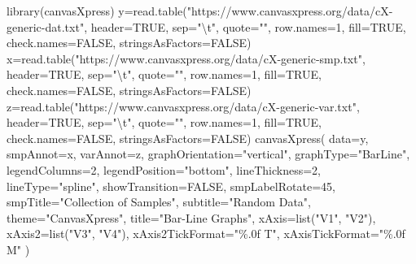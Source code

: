 \documentclass[
  letterpaper,
]{scrbook}
\newenvironment{Shaded}{\begin{snugshade}}{\end{snugshade}}
\newcommand{\AttributeTok}[1]{\textcolor[rgb]{0.40,0.45,0.13}{#1}}
\newcommand{\ConstantTok}[1]{\textcolor[rgb]{0.56,0.35,0.01}{#1}}
\newcommand{\DecValTok}[1]{\textcolor[rgb]{0.68,0.00,0.00}{#1}}
\newcommand{\FunctionTok}[1]{\textcolor[rgb]{0.28,0.35,0.67}{#1}}
\newcommand{\NormalTok}[1]{\textcolor[rgb]{0.00,0.23,0.31}{#1}}
\newcommand{\OtherTok}[1]{\textcolor[rgb]{0.00,0.23,0.31}{#1}}
\newcommand{\SpecialCharTok}[1]{\textcolor[rgb]{0.37,0.37,0.37}{#1}}
\newcommand{\StringTok}[1]{\textcolor[rgb]{0.13,0.47,0.30}{#1}}
\begin{document}
\begin{Shaded}
\begin{Highlighting}[]
\FunctionTok{library}\NormalTok{(canvasXpress)}
\NormalTok{y}\OtherTok{=}\FunctionTok{read.table}\NormalTok{(}\StringTok{"https://www.canvasxpress.org/data/cX{-}generic{-}dat.txt"}\NormalTok{, }\AttributeTok{header=}\ConstantTok{TRUE}\NormalTok{, }\AttributeTok{sep=}\StringTok{"}\SpecialCharTok{\textbackslash{}t}\StringTok{"}\NormalTok{, }\AttributeTok{quote=}\StringTok{""}\NormalTok{, }\AttributeTok{row.names=}\DecValTok{1}\NormalTok{, }\AttributeTok{fill=}\ConstantTok{TRUE}\NormalTok{, }\AttributeTok{check.names=}\ConstantTok{FALSE}\NormalTok{, }\AttributeTok{stringsAsFactors=}\ConstantTok{FALSE}\NormalTok{)}
\NormalTok{x}\OtherTok{=}\FunctionTok{read.table}\NormalTok{(}\StringTok{"https://www.canvasxpress.org/data/cX{-}generic{-}smp.txt"}\NormalTok{, }\AttributeTok{header=}\ConstantTok{TRUE}\NormalTok{, }\AttributeTok{sep=}\StringTok{"}\SpecialCharTok{\textbackslash{}t}\StringTok{"}\NormalTok{, }\AttributeTok{quote=}\StringTok{""}\NormalTok{, }\AttributeTok{row.names=}\DecValTok{1}\NormalTok{, }\AttributeTok{fill=}\ConstantTok{TRUE}\NormalTok{, }\AttributeTok{check.names=}\ConstantTok{FALSE}\NormalTok{, }\AttributeTok{stringsAsFactors=}\ConstantTok{FALSE}\NormalTok{)}
\NormalTok{z}\OtherTok{=}\FunctionTok{read.table}\NormalTok{(}\StringTok{"https://www.canvasxpress.org/data/cX{-}generic{-}var.txt"}\NormalTok{, }\AttributeTok{header=}\ConstantTok{TRUE}\NormalTok{, }\AttributeTok{sep=}\StringTok{"}\SpecialCharTok{\textbackslash{}t}\StringTok{"}\NormalTok{, }\AttributeTok{quote=}\StringTok{""}\NormalTok{, }\AttributeTok{row.names=}\DecValTok{1}\NormalTok{, }\AttributeTok{fill=}\ConstantTok{TRUE}\NormalTok{, }\AttributeTok{check.names=}\ConstantTok{FALSE}\NormalTok{, }\AttributeTok{stringsAsFactors=}\ConstantTok{FALSE}\NormalTok{)}
\FunctionTok{canvasXpress}\NormalTok{(}
  \AttributeTok{data=}\NormalTok{y,}
  \AttributeTok{smpAnnot=}\NormalTok{x,}
  \AttributeTok{varAnnot=}\NormalTok{z,}
  \AttributeTok{graphOrientation=}\StringTok{"vertical"}\NormalTok{,}
  \AttributeTok{graphType=}\StringTok{"BarLine"}\NormalTok{,}
  \AttributeTok{legendColumns=}\DecValTok{2}\NormalTok{,}
  \AttributeTok{legendPosition=}\StringTok{"bottom"}\NormalTok{,}
  \AttributeTok{lineThickness=}\DecValTok{2}\NormalTok{,}
  \AttributeTok{lineType=}\StringTok{"spline"}\NormalTok{,}
  \AttributeTok{showTransition=}\ConstantTok{FALSE}\NormalTok{,}
  \AttributeTok{smpLabelRotate=}\DecValTok{45}\NormalTok{,}
  \AttributeTok{smpTitle=}\StringTok{"Collection of Samples"}\NormalTok{,}
  \AttributeTok{subtitle=}\StringTok{"Random Data"}\NormalTok{,}
  \AttributeTok{theme=}\StringTok{"CanvasXpress"}\NormalTok{,}
  \AttributeTok{title=}\StringTok{"Bar{-}Line Graphs"}\NormalTok{,}
  \AttributeTok{xAxis=}\FunctionTok{list}\NormalTok{(}\StringTok{"V1"}\NormalTok{, }\StringTok{"V2"}\NormalTok{),}
  \AttributeTok{xAxis2=}\FunctionTok{list}\NormalTok{(}\StringTok{"V3"}\NormalTok{, }\StringTok{"V4"}\NormalTok{),}
  \AttributeTok{xAxis2TickFormat=}\StringTok{"\%.0f T"}\NormalTok{,}
  \AttributeTok{xAxisTickFormat=}\StringTok{"\%.0f M"}
\NormalTok{)}
\end{Highlighting}
\end{Shaded}
\end{document}

